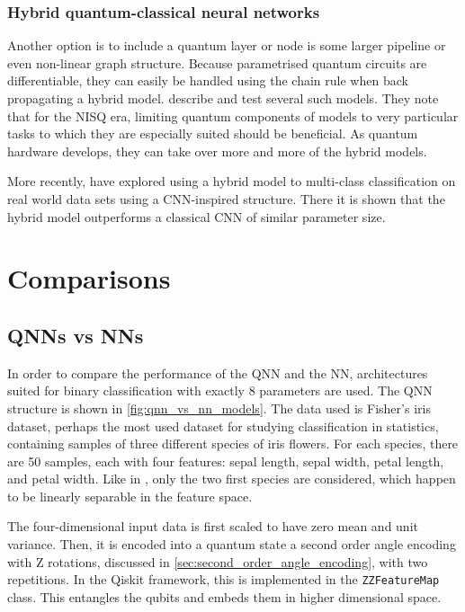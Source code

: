\subsubsection{Hybrid quantum-classical neural networks}
Another option is to include a quantum layer or node is some larger pipeline or even non-linear graph structure.
Because parametrised quantum circuits are differentiable, they can easily be handled using the chain rule when back propagating a hybrid model.
\textcite{killoran2019} describe and test several such models.
They note that for the NISQ era, limiting quantum components of models to very particular tasks to which they are especially suited should be beneficial.
As quantum hardware develops, they can take over more and more of the hybrid models.


More recently, \textcite{zeng2022} have explored using a hybrid model to multi-class classification on real world data sets using a CNN-inspired structure.
There it is shown that the hybrid model outperforms a classical CNN of similar parameter size.

\section{Comparisons}
\subsection{QNNs vs NNs}\label{sec:qnn-vs-nn}

In order to compare the performance of the QNN and the NN, architectures suited for binary classification with exactly 8 parameters are used.
The QNN structure is shown in \cref{fig:qnn_vs_nn_models}.
The data used is Fisher's iris dataset, perhaps the most used dataset for studying classification in statistics, containing samples of three different species of iris flowers.
For each species, there are 50 samples, each with four features: sepal length, sepal width, petal length, and petal width.
Like in \cite{abbas2021}, only the two first species are considered, which happen to be linearly separable in the feature space.

The four-dimensional input data is first scaled to have zero mean and unit variance.
Then, it is encoded into a quantum state a second order angle encoding with Z rotations, discussed in \cref{sec:second_order_angle_encoding}, with two repetitions.
In the Qiskit framework, this is implemented in the \texttt{ZZFeatureMap} class.
This entangles the qubits and embeds them in higher dimensional space.

